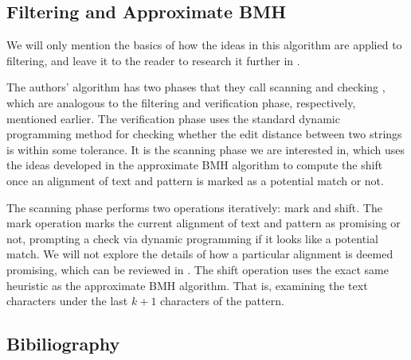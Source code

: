 \documentclass[10pt]{article}
\begin{document}
\subsection*{Filtering and Approximate BMH}

We will only mention the basics of how the ideas in this algorithm are applied to filtering, and leave it to the reader
to research it further in \cite{taruk93}.

The authors' algorithm has two phases that they call scanning and checking \cite{taruk93}, which are analogous to the
filtering and verification phase, respectively, mentioned earlier. The verification phase uses the standard dynamic
programming method for checking whether the edit distance between two strings is within some tolerance. It is the
scanning phase we are interested in, which uses the ideas developed in the approximate BMH algorithm to compute the
shift once an alignment of text and pattern is marked as a potential match or not.

The scanning phase performs two operations iteratively: mark and shift. The mark operation marks the current alignment
of text and pattern as promising or not, prompting a check via dynamic programming if it looks like a potential match.
We will not explore the details of how a particular alignment is deemed promising, which can be reviewed in \cite{taruk93}.
The shift operation uses the exact same heuristic as the approximate BMH algorithm. That is, examining the text
characters under the last $k+1$ characters of the pattern.






\subsection*{Bibiliography}
\end{document}
